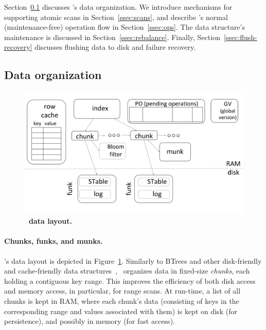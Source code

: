 
Section~\ref{ssec:layout}  discusses \sys's data organization. 
We introduce mechanisms for supporting 
atomic scans  in Section~\ref{ssec:scans}, and describe \sys's
 normal (maintenance-free) operation flow  in Section~\ref{ssec:ops}.  
The data structure's maintenance is discussed in Section~\ref{ssec:rebalance}.
Finally, Section~\ref{ssec:flush-recovery} discusses flushing data to disk and failure recovery.


\subsection{Data organization}
\label{ssec:layout}

\begin{figure}[tb]
\centerline{
\includegraphics[width=\columnwidth]{PiWi.png}
}
\caption{\bf{\sys\ data layout.}}
\label{fig:layout}
\end{figure}

\paragraph{Chunks, funks, and munks.}

\sys's data layout is depicted in Figure~\ref{fig:layout}.
Similarly to BTrees and other disk-friendly and cache-friendly data structures~\cite{kiwi}, 
\sys\ organizes data in fixed-size \emph{chunks}, each holding a contiguous key range.
This improves the efficiency of both disk access and memory access, in particular, for  range scans. 
At run-time, a list of all chunks is kept in RAM, where each chunk's data 
(consisting of keys in the corresponding range and values associated with them) 
is kept on disk (for persistence), and possibly in memory (for fast access). 

